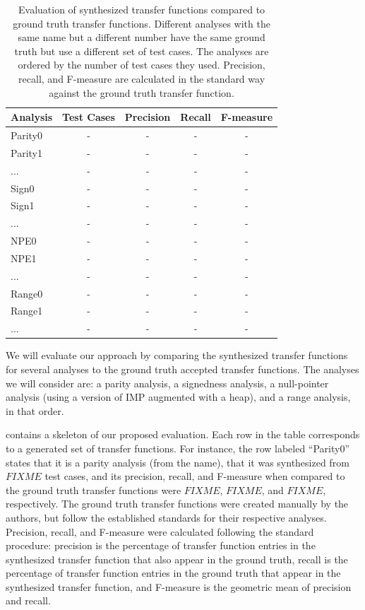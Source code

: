 \documentclass[10pt,conference]{IEEEtran}
\begin{document}
\begin{table}
\centering
 \begin{tabular}{l c c c c }
  
  Analysis & Test Cases & Precision & Recall & F-measure\\ 
  \midrule
  Parity0 & - & - & - & - \\
  Parity1 & - & - & - & - \\
  ... & - & - & - & - \\
  Sign0 & - & - & - & - \\
  Sign1 & - & - & - & - \\
  ... & - & - & - & - \\
  NPE0 & - & - & - & - \\
  NPE1 & - & - & - & - \\
  ... & - & - & - & - \\
  Range0 & - & - & - & - \\
  Range1 & - & - & - & - \\
  ... & - & - & - & - \\
 \end{tabular}
 \caption{Evaluation of synthesized transfer functions compared
 to ground truth transfer functions. Different analyses with
 the same name but a different number have the same ground truth
 but use a different set of test cases. The analyses are ordered
 by the number of test cases they used. Precision, recall, and
 F-measure are calculated in the standard way against the ground
 truth transfer function.}
 \label{tab-analyses}
\end{table}

We will evaluate our approach by comparing the synthesized transfer
functions for several analyses to the ground truth accepted transfer
functions. The analyses we will consider are: a parity analysis,
a signedness analysis, a null-pointer analysis (using a version of
IMP augmented with a heap), and a range analysis, in that order.

 contains a skeleton of our proposed evaluation.
Each row in the table corresponds to a generated set of transfer functions.
For instance,
the row labeled ``Parity0'' states that it is a parity analysis
(from the name), that it was synthesized from $FIXME$ test cases,
and its precision, recall, and F-measure when compared to the ground
truth transfer functions were $FIXME$, $FIXME$, and $FIXME$, respectively.
The ground truth transfer functions were created manually by the authors,
but follow the established standards for their respective analyses.
Precision, recall, and F-measure were calculated following the standard
procedure: precision is the percentage of transfer function entries
in the synthesized transfer function that also appear in the ground truth,
recall is the percentage of transfer function entries in the ground truth
that appear in the synthesized transfer function, and F-measure is the
geometric mean of precision and recall.
\end{document}
